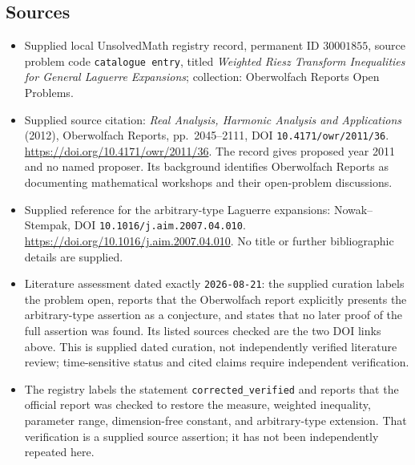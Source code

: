 \documentclass[11pt]{article}
\begin{document}
\subsection{Sources}
\begin{itemize}
\item Supplied local UnsolvedMath registry record, permanent ID \(30001855\), source problem code \texttt{catalogue entry}, titled \emph{Weighted Riesz Transform Inequalities for General Laguerre Expansions}; collection: Oberwolfach Reports Open Problems.
\item Supplied source citation: \emph{Real Analysis, Harmonic Analysis and Applications} (2012), Oberwolfach Reports, pp.\ 2045--2111, DOI \texttt{10.4171/owr/2011/36}. \url{https://doi.org/10.4171/owr/2011/36}. The record gives proposed year 2011 and no named proposer. Its background identifies Oberwolfach Reports as documenting mathematical workshops and their open-problem discussions.
\item Supplied reference for the arbitrary-type Laguerre expansions: Nowak--Stempak, DOI \texttt{10.1016/j.aim.2007.04.010}. \url{https://doi.org/10.1016/j.aim.2007.04.010}. No title or further bibliographic details are supplied.
\item Literature assessment dated exactly \texttt{2026-08-21}: the supplied curation labels the problem open, reports that the Oberwolfach report explicitly presents the arbitrary-type assertion as a conjecture, and states that no later proof of the full assertion was found. Its listed sources checked are the two DOI links above. This is supplied dated curation, not independently verified literature review; time-sensitive status and cited claims require independent verification.
\item The registry labels the statement \texttt{corrected\_verified} and reports that the official report was checked to restore the measure, weighted inequality, parameter range, dimension-free constant, and arbitrary-type extension. That verification is a supplied source assertion; it has not been independently repeated here.
\end{itemize}
\end{document}
